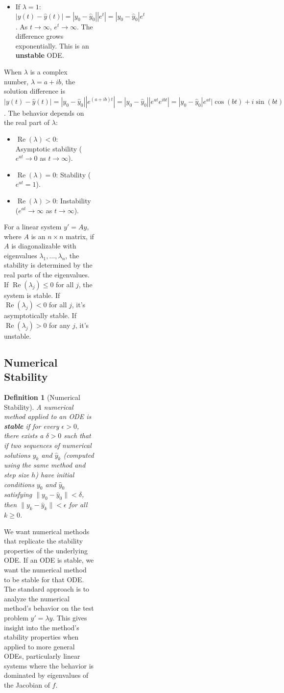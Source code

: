 \documentclass{article}
\newtheorem{definition}{Definition}
\newtheorem{definition}{Definition}
\begin{document}
\begin{figure}[h]
\begin{figure}[h]
\begin{figure}[h]
\begin{figure}[h]
\begin{itemize}
    \item If $\lambda = 1$: $|y(t) - \hat{y}(t)| = |y_0 - \hat{y}_0| |e^{t}| = |y_0 - \hat{y}_0| e^{t}$. As $t \to \infty$, $e^{t} \to \infty$. The difference grows exponentially. This is an \textbf{unstable} ODE.
\end{itemize}
When $\lambda$ is a complex number, $\lambda = a + ib$, the solution difference is $|y(t) - \hat{y}(t)| = |y_0 - \hat{y}_0| |e^{(a+ib)t}| = |y_0 - \hat{y}_0| |e^{at} e^{ibt}| = |y_0 - \hat{y}_0| e^{at} |\cos(bt) + i \sin(bt)| = |y_0 - \hat{y}_0| e^{at}$. The behavior depends on the real part of $\lambda$:
\begin{itemize}
    \item $\operatorname{Re}(\lambda) < 0$: Asymptotic stability ($e^{at} \to 0$ as $t \to \infty$).
    \item $\operatorname{Re}(\lambda) = 0$: Stability ($e^{at} = 1$).
    \item $\operatorname{Re}(\lambda) > 0$: Instability ($e^{at} \to \infty$ as $t \to \infty$).
\end{itemize}
For a linear system $y' = Ay$, where $A$ is an $n \times n$ matrix, if $A$ is diagonalizable with eigenvalues $\lambda_1, \dots, \lambda_n$, the stability is determined by the real parts of the eigenvalues. If $\operatorname{Re}(\lambda_j) \le 0$ for all $j$, the system is stable. If $\operatorname{Re}(\lambda_j) < 0$ for all $j$, it's asymptotically stable. If $\operatorname{Re}(\lambda_j) > 0$ for any $j$, it's unstable.
\subsection{Numerical Stability}
\begin{definition}[Numerical Stability]
A numerical method applied to an ODE is \textbf{stable} if for every $\epsilon > 0$, there exists a $\delta > 0$ such that if two sequences of numerical solutions $y_k$ and $\hat{y}_k$ (computed using the same method and step size $h$) have initial conditions $y_0$ and $\hat{y}_0$ satisfying $\|y_0 - \hat{y}_0\| < \delta$, then $\|y_k - \hat{y}_k\| < \epsilon$ for all $k \ge 0$.
\end{definition}
We want numerical methods that replicate the stability properties of the underlying ODE. If an ODE is stable, we want the numerical method to be stable for that ODE. The standard approach is to analyze the numerical method's behavior on the test problem $y' = \lambda y$. This gives insight into the method's stability properties when applied to more general ODEs, particularly linear systems where the behavior is dominated by eigenvalues of the Jacobian of $f$.

\end{figure}
\end{figure}
\end{figure}
\end{figure}
\end{document}
